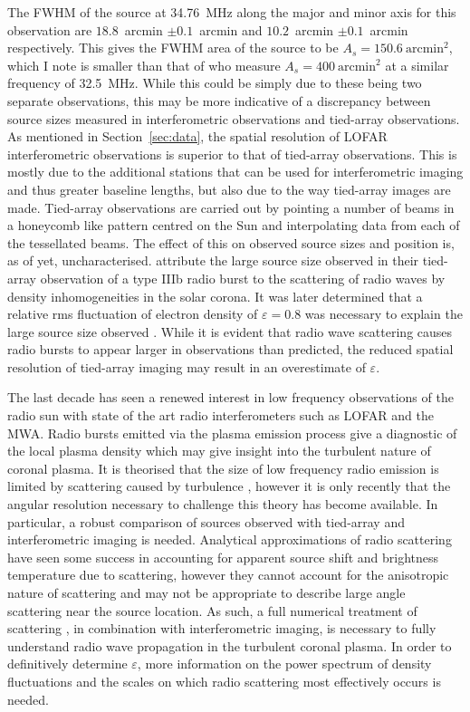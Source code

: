 The FWHM of the source at 34.76~MHz along the major and minor axis for this observation are $18.8$~arcmin $\pm 0.1$~arcmin and $10.2$~arcmin $\pm 0.1$~arcmin respectively. This gives the FWHM area of the source to be $A_s = 150.6~\mbox{arcmin}^2$, which I note is smaller than that of \cite{Kontar2017} who measure $A_s = 400~\mbox{arcmin}^2$ at a similar frequency of 32.5~MHz. While this could be simply due to these being two separate observations, this may be more indicative of a discrepancy between source sizes measured in interferometric observations and tied-array observations.
As mentioned in Section~\ref{sec:data}, the spatial resolution of LOFAR interferometric observations is superior to that of tied-array observations. This is mostly due to the additional stations that can be used for interferometric imaging and thus greater baseline lengths, but also due to the way tied-array images are made. Tied-array observations are carried out by pointing a number of beams in a honeycomb like pattern centred on the Sun and interpolating data from each of the tessellated beams. The effect of this on observed source sizes and position is, as of yet, uncharacterised. \cite{Kontar2017} attribute the large source size observed in their tied-array observation of a type IIIb radio burst to the scattering of radio waves by density inhomogeneities in the solar corona. It was later determined that a relative rms fluctuation of electron density of $\varepsilon = 0.8$ was necessary to explain the large source size observed \cite{Kontar2019}. While it is evident that radio wave scattering causes radio bursts to appear larger in observations than predicted, the reduced spatial resolution of tied-array imaging may result in an overestimate of $\varepsilon$.

The last decade has seen a renewed interest in low frequency observations of the radio sun with state of the art radio interferometers such as LOFAR and the MWA. Radio bursts emitted via the plasma emission process give a diagnostic of the local plasma density which may give insight into the turbulent nature of coronal plasma. It is theorised that the size of low frequency radio emission is limited by scattering caused by turbulence \citep{Bastian1994}, however it is only recently that the angular resolution necessary to challenge this theory has become available. In particular, a robust comparison of sources observed with tied-array and interferometric imaging is needed. Analytical approximations of radio scattering \citep[e.g.][]{Chrysaphi2018,Gordovskyy2019,Sharma2020} have seen some success in accounting for apparent source shift and brightness temperature due to scattering, however they cannot account for the anisotropic nature of scattering and may not be appropriate to describe large angle scattering near the source location. As such, a full numerical treatment of scattering \citep[e.g.][]{Thejappa2008, Bian2019, Kontar2019}, in combination with interferometric imaging, is necessary to fully understand radio wave propagation in the turbulent coronal plasma. In order to definitively determine $\varepsilon$, more information on the power spectrum of density fluctuations and the scales on which radio scattering most effectively occurs is needed.


